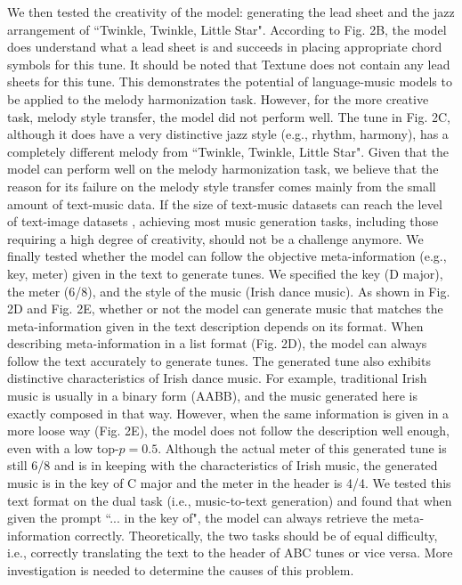 \documentclass[letterpaper]{article} %
\begin{document}
We then tested the creativity of the model: generating the lead sheet and the jazz arrangement of ``Twinkle, Twinkle, Little Star". According to Fig. 2B, the model does understand what a lead sheet is and succeeds in placing appropriate chord symbols for this tune. It should be noted that Textune does not contain any lead sheets for this tune. This demonstrates the potential of language-music models to be applied to the melody harmonization task. However, for the more creative task, melody style transfer, the model did not perform well. The tune in Fig. 2C, although it does have a very distinctive jazz style (e.g., rhythm, harmony), has a completely different melody from  ``Twinkle, Twinkle, Little Star". Given that the model can perform well on the melody harmonization task, we believe that the reason for its failure on the melody style transfer comes mainly from the small amount of text-music data. If the size of text-music datasets can reach the level of text-image datasets \cite{DBLP:journals/corr/abs-2111-02114}, achieving most music generation tasks, including those requiring a high degree of creativity, should not be a challenge anymore.  We finally tested whether the model can follow the objective meta-information (e.g., key, meter) given in the text to generate tunes. We specified the key (D major), the meter (6/8), and the style of the music (Irish dance music). As shown in Fig. 2D and Fig. 2E, whether or not the model can generate music that matches the meta-information given in the text description depends on its format. When describing meta-information in a list format (Fig. 2D), the model can always follow the text accurately to generate tunes. The generated tune also exhibits distinctive characteristics of Irish dance music. For example, traditional Irish music is usually in a binary form (AABB), and the music generated here is exactly composed in that way. However, when the same information is given in a more loose way (Fig. 2E), the model does not follow the description well enough, even with a low top-$p=0.5$. Although the actual meter of this generated tune is still 6/8 and is in keeping with the characteristics of Irish music, the generated music is in the key of C major and the meter in the header is 4/4. We tested this text format on the dual task (i.e., music-to-text generation) and found that when given the prompt ``... in the key of", the model can always retrieve the meta-information correctly. Theoretically, the two tasks should be of equal difficulty, i.e., correctly translating the text to the header of ABC tunes or vice versa. More investigation is needed to determine the causes of this problem.
\end{document}
